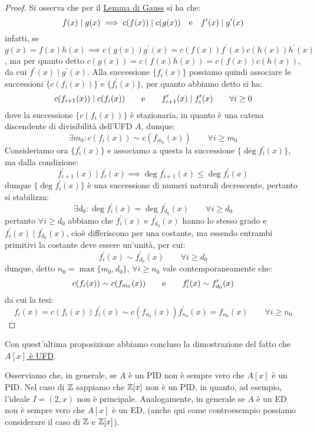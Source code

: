\documentclass[11pt]{scrartcl}
\begin{document}
\begin{proof}
    Si osserva che per il \hyperref[gauss]{Lemma di Gauss} si ha che:
    \[ f(x) \mid g(x) \implies c(f(x)) \mid c(g(x)) \quad \text e \quad f^{\prime}(x) \mid g^{\prime}(x)
        \]
    infatti, se $g(x) = f(x) h(x) \implies c(g(x))g^{\prime}(x) = c(f(x))f^{\prime}(x)c(h(x))h^{\prime}(x)$,
    ma per quanto detto $c(g(x)) = c(f(x)h(x)) = c(f(x))c(h(x))$, da cui $f^{\prime}(x) \mid g^{\prime}(x)$.
    Alla successione $\{f_i(x)\}$ possiamo quindi associare le successioni $\{c(f_i(x))\}$ e $\{f_i^{\prime}(x)\}$, per quanto abbiamo detto si ha:
    \[ c(f_{i+1}(x)) \mid c(f_{i}(x)) \qquad \text e \qquad f_{i+1}^{\prime}(x) \mid f_i^{\prime}(x) \qquad \forall i \geq 0
        \]
    dove la successione $\{c(f_i(x))\}$ è stazionaria, in quanto è una catena discendente di divisibilità dell'UFD $A$, dunque:
    \[ \exists m_0 : c(f_i(x)) \sim c(f_{m_0}(x)) \qquad \forall i \geq m_0
        \]
    Consideriamo ora $\{f_i^{\prime}(x)\}$ e associamo a questa la successione $\{\deg f_i^{\prime}(x)\}$, ma dalla condizione:
    \[ f_{i+1}^{\prime}(x) \mid f_i^{\prime}(x) \implies \deg f_{i+1}^{\prime}(x) \leq \deg f_i^{\prime}(x)
        \]
    dunque $\{\deg f_i^{\prime}(x)\}$ è una successione di numeri naturali decrescente, pertanto si stabilizza:
    \[ \exists d_0 : \deg f_{i}^{\prime}(x) = \deg f_{d_0}^{\prime}(x) \qquad \forall i \geq d_0
        \]
    pertanto $\forall i \geq d_0$ abbiamo che $f_i^{\prime}(x)$ e $f_{d_0}^{\prime}(x)$ hanno lo stesso grado e $f_{i}^{\prime}(x) \mid f_{d_0}^{\prime}(x)$,
    cioè differiscono per una costante, ma essendo entrambi primitivi la costante deve essere un'unità, per cui:
    \[ f_{i}^{\prime}(x) \sim f_{d_0}^{\prime}(x) \qquad \forall i \geq d_0
        \]
    dunque, detto $n_0 = \max\{m_0,d_0\}$, $\forall i \geq n_0$ vale contemporaneamente che:
    \[ c(f_i(x)) \sim c(f_{m_0}(x)) \qquad \text e \qquad f_{i}^{\prime}(x) \sim f_{d_0}^{\prime}(x)
        \]
    da cui la tesi:
    \[ f_i(x) = c(f_i(x))f_{i}^{\prime}(x) \sim c(f_{n_0}(x))f_{n_0}^{\prime}(x) = f_{n_0}(x) \qquad \forall i \geq n_0
        \]
\end{proof}

Con quest'ultima proposizione abbiamo concluso la dimostrazione del fatto che \hyperref[2.109]{$A[x]$ è UFD}.

\begin{remark}
    Osserviamo che, in generale, se $A$ è un PID non è sempre vero che $A[x]$ è un PID. 
    Nel caso di $\mathbb Z$ sappiamo che $\mathbb Z[x]$ non è un PID, in quanto, ad esempio, l'ideale $I = (2,x)$ non è principale. 
    Analogamente, in generale se $A$ è un ED non è sempre vero che $A[x]$ è un ED, 
    (anche qui come controesempio possiamo considerare il caso di $\mathbb Z$ e $\mathbb Z[x]$).
\end{remark}
\end{document}
